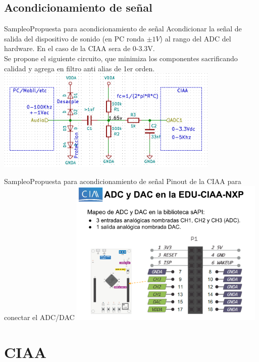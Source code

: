  \subsection{Acondicionamiento de señal}
 \begin{frame}{Sampleo}{Propuesta para acondicionamiento de señal}
    Acondicionar la señal de salida del dispositivo de sonido (en PC ronda $\pm1V$) al rango del ADC del hardware. En el caso de la CIAA sera de 0-3.3V. \\ 
    Se propone el siguiente circuito, que minimiza los componentes sacrificando calidad y agrega en filtro anti alias de 1er orden.
    \protoboardicon
    \center\includegraphics[width=0.8\textwidth]{1_clase/circuito}
    \vfill
 \end{frame}
 \begin{frame}{Sampleo}{Propuesta para acondicionamiento de señal}
    Pinout de la CIAA para conectar el ADC/DAC
    \protoboardicon
    \center\includegraphics[width=0.7\textwidth]{1_clase/adc_dac_pins}
    \vfill
 \end{frame}
 \section{CIAA}
